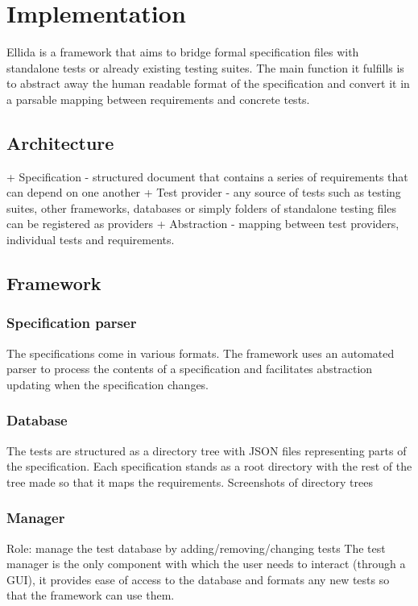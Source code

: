 \documentclass{article}
\begin{document}
	\section{Implementation}

		Ellida is a framework that aims to bridge formal specification files with standalone tests or already existing testing suites. The main function it fulfills is to abstract away the human readable format of the specification and convert it in a parsable mapping between requirements and concrete tests.


		\subsection{Architecture}
		+ Specification - structured document that contains a series of requirements that can depend on one another
		+ Test provider - any source of tests such as testing suites, other frameworks, databases or simply folders of standalone testing files can be registered as providers
		+ Abstraction - mapping between test providers, individual tests and requirements.

		\subsection{Framework}

			\subsubsection{Specification parser}
				The specifications come in various formats. The framework uses an automated parser to process the contents of a specification and facilitates abstraction updating when the specification changes.
			\subsubsection{Database}
				The tests are structured as a directory tree with JSON files representing parts of the specification. Each specification stands as a root directory with the rest of the tree made so that it maps the requirements.
				Screenshots of directory trees

			\subsubsection{Manager}

				Role: manage the test database by adding/removing/changing tests
				The test manager is the only component with which the user needs to interact (through a GUI), it provides ease of access to the database and formats any new tests so that the framework can use them.
\end{document}
